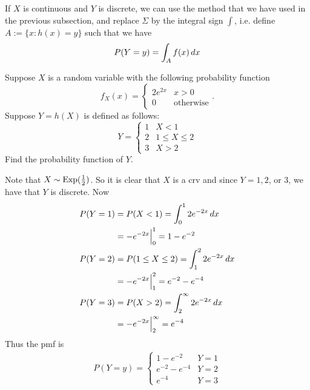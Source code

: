 \documentclass[notoc,notitlepage]{tufte-book}
\begin{document}
If $X$ is continuous and $Y$ is discrete, we can use the method that we have used in the previous subsection, and replace $\Sigma$ by the integral sign $\int$, i.e. define $A := \{x : h(x) = y\}$ such that we have
\begin{equation*}
  P(Y = y) = \int_{A} f(x) \mathop{}\!d{x}
\end{equation*}

\begin{eg}[Example 2.9]\label{eg:cont_x_disc_y}
  Suppose $X$ is a random variable with the following probability function
  \begin{equation*}
    f_X(x) = \begin{cases}
      2e^{2x} & x > 0 \\
      0       & \text{otherwise}
    \end{cases}.
  \end{equation*}
  Suppose $Y = h(X)$ is defined as follows:
  \begin{equation*}
    Y = \begin{cases}
      1 & X < 1 \\
      2 & 1 \leq X \leq 2 \\
      3 & X > 2
    \end{cases}
  \end{equation*}
  Find the probability function of $Y$.

  \begin{solution}
    Note that $X \sim \operatorname{Exp}(\frac{1}{2})$. So it is clear that $X$ is a crv and since $Y = 1, 2$, or $3$, we have that $Y$ is discrete. Now
    \begin{align*}
      P(Y = 1) &= P(X < 1) = \int_{0}^{1} 2e^{-2x} \mathop{}\!d{x} \\
               &= -e^{-2x} \Big|_{0}^{1} = 1 - e^{-2} \\
      P(Y = 2) &= P(1 \leq X \leq 2) = \int_{1}^{2} 2e^{-2x} \mathop{}\!d{x} \\
               &= -e^{-2x} \Big|_{1}^{2} = e^{-2} - e^{-4} \\
      P(Y = 3) &= P(X > 2) = \int_{2}^{\infty} 2e^{-2x} \mathop{}\!d{x} \\
               &= -e^{-2x} \Big|_{2}^{\infty} = e^{-4}
    \end{align*}
    Thus the pmf is
    \begin{align*}
      P(Y = y) = \begin{cases}
        1 - e^{-2}      & Y = 1 \\
        e^{-2} - e^{-4} & Y = 2 \\
        e^{-4}          & Y = 3
      \end{cases}
    \end{align*}
  \end{solution}
\end{eg}
\end{document}

